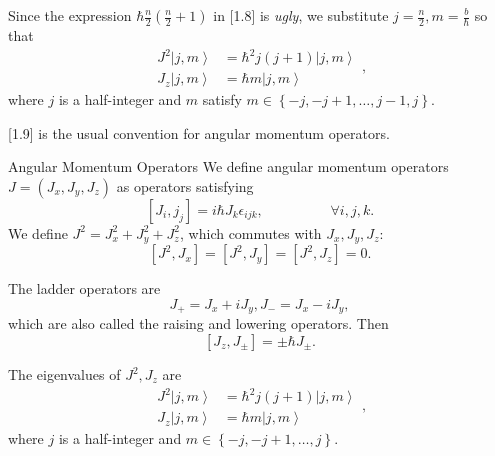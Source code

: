 \documentclass[phys334]{subfiles}
\begin{document}
    Since the expression $\hbar \frac{n}{2}\left( \frac{n}{2}+1 \right)$ in [1.8] is \textit{ugly}, we substitute $j = \frac{n}{2}, m = \frac{b}{\hbar}$ so that
    \begin{equation}
        \begin{aligned}
            J^{2}\left| j,m \right\rangle & = \hbar^{2}j\left( j+1 \right)\left| j,m \right\rangle \\
            J_z\left| j,m \right\rangle & = \hbar m\left| j,m \right\rangle
        \end{aligned} ,
    \end{equation}
    where $j$ is a half-integer and $m$ satisfy $m\in\left\lbrace -j,-j+1,\ldots,j-1,j \right\rbrace$.

    [1.9] is the usual convention for angular momentum operators.

    \begin{summary}{Angular Momentum Operators}
        We define angular momentum operators $J = \left( J_x,J_y,J_z \right)$ as operators satisfying
        \begin{equation*}
            \left[ J_i,j_j \right] = i\hbar J_k\epsilon_{ijk}, \hspace{2cm}\forall i,j,k.
        \end{equation*}
        We define $J^{2} = J_x^{2}+J_y^{2}+J_z^{2}$, which commutes with $J_x,J_y,J_z$:
        \begin{equation*}
            \left[ J^{2},J_x \right] = \left[ J^{2},J_y \right] = \left[ J^{2},J_z \right] = 0.
        \end{equation*}

        The ladder operators are
        \begin{equation*}
            J_+ = J_x+iJ_y, J_- = J_x-iJ_y,
        \end{equation*}
        which are also called the raising and lowering operators. Then
        \begin{equation*}
            \left[ J_z,J_{\pm} \right] = \pm\hbar J_{\pm}.
        \end{equation*}

        The eigenvalues of $J^{2},J_z$ are
        \begin{equation*}
            \begin{aligned}
                J^{2}\left| j,m \right\rangle & = \hbar^{2}j\left( j+1 \right)\left| j,m \right\rangle \\
                J_z\left| j,m \right\rangle & = \hbar m\left| j,m \right\rangle
            \end{aligned} ,
        \end{equation*}
        where $j$ is a half-integer and $m\in\left\lbrace -j,-j+1,\ldots,j \right\rbrace$. 
    \end{summary}
\end{document}
